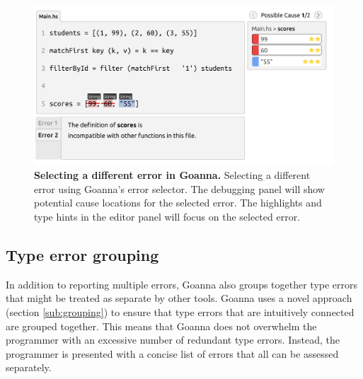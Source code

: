     \begin{figure}[htb!]
        \centering
        \includegraphics[width=\linewidth]{images/goanna-multi-error}
        \caption{\textbf{Selecting a different error in Goanna.} Selecting a different error using Goanna's error selector. The debugging panel will show potential cause locations for the selected error. The highlights and type hints in the editor panel will focus on the selected error.}
        \label{fig:multi-error}
    \end{figure}



    \subsection{Type error grouping}  \label{sub:group}
    In addition to reporting multiple errors, Goanna also groups together type errors that might be treated as separate by other tools. Goanna uses a novel approach (section \ref{sub:grouping}) to ensure that type errors that are intuitively connected are grouped together. This means that Goanna does not overwhelm the programmer with an excessive number of redundant type errors. Instead, the programmer is presented with a concise list of errors that all can be assessed separately.

